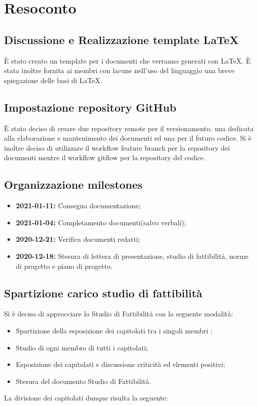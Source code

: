 \newpage


\section{Resoconto}

\subsection{Discussione e Realizzazione template \LaTeX}

È stato creato un template per i documenti che verranno generati con \LaTeX. È stata inoltre fornita ai membri con lacune nell'uso del linguaggio una breve spiegazione delle basi di \LaTeX.

\subsection{Impostazione repository GitHub}

È stato deciso di creare due repository remote per il versionamento, una dedicata alla elaborazione e mantenimento dei documenti ed una per il futuro codice. Si è inoltre deciso di utilizzare il workflow feature branch per la repository dei documenti mentre il workflow gitflow per la repository del codice.

\subsection{Organizzazione milestones}

\begin{itemize}

	\item \textbf{2021-01-11:} Consegna documentazione;
	\item \textbf{2021-01-04:} Completamento documenti(salvo verbali);
	\item \textbf{2020-12-21:} Verifica documenti redatti;
	\item \textbf{2020-12-18:} Stesura di lettera di presentazione, studio di fattibilità, norme di progetto e piano di progetto.
	
\end{itemize}

\subsection{Spartizione carico studio di fattibilità}

Si è deciso di approcciare lo Studio di Fattibilità con la seguente modalità: 
\begin{itemize}
	\item Spartizione della esposizione dei capitolati tra i singoli membri	;
	\item Studio di ogni membro di tutti i capitolati;
	\item Esposizione dei capitolati e discussione criticità ed elementi positivi;
	\item Stesura del documento Studio di Fattibilità.
\end{itemize}
La divisione dei capitolati dunque risulta la seguente:

